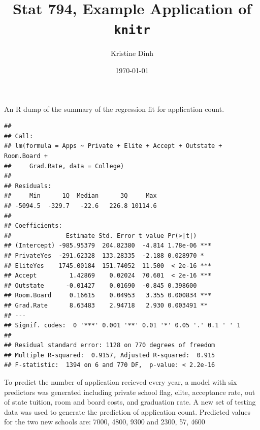 \documentclass{article}\usepackage[]{graphicx}\usepackage[]{color}
\title{Stat 794, Example Application of \texttt{knitr}}
\author{Kristine Dinh}
\date{\today}
\makeatletter
\newenvironment{kframe}{%
 \def\at@end@of@kframe{}%
 \ifinner\ifhmode%
  \def\at@end@of@kframe{\end{minipage}}%
  \begin{minipage}{\columnwidth}%
 \fi\fi%
 \def\FrameCommand##1{\hskip\@totalleftmargin \hskip-\fboxsep
 \colorbox{shadecolor}{##1}\hskip-\fboxsep
     \hskip-\linewidth \hskip-\@totalleftmargin \hskip\columnwidth}%
 \MakeFramed {\advance\hsize-\width
   \@totalleftmargin\z@ \linewidth\hsize
   \@setminipage}}%
 {\par\unskip\endMakeFramed%
 \at@end@of@kframe}
\newenvironment{knitrout}{}{} %
\makeatother
\begin{document}
 
\maketitle





  





An R dump of the summary of the regression fit for application count.
\begin{knitrout}
\color{fgcolor}\begin{kframe}
\begin{verbatim}
## 
## Call:
## lm(formula = Apps ~ Private + Elite + Accept + Outstate + Room.Board + 
##     Grad.Rate, data = College)
## 
## Residuals:
##     Min      1Q  Median      3Q     Max 
## -5094.5  -329.7   -22.6   226.8 10114.6 
## 
## Coefficients:
##               Estimate Std. Error t value Pr(>|t|)    
## (Intercept) -985.95379  204.82380  -4.814 1.78e-06 ***
## PrivateYes  -291.62328  133.28335  -2.188 0.028970 *  
## EliteYes    1745.00184  151.74052  11.500  < 2e-16 ***
## Accept         1.42869    0.02024  70.601  < 2e-16 ***
## Outstate      -0.01427    0.01690  -0.845 0.398600    
## Room.Board     0.16615    0.04953   3.355 0.000834 ***
## Grad.Rate      8.63483    2.94718   2.930 0.003491 ** 
## ---
## Signif. codes:  0 '***' 0.001 '**' 0.01 '*' 0.05 '.' 0.1 ' ' 1
## 
## Residual standard error: 1128 on 770 degrees of freedom
## Multiple R-squared:  0.9157,	Adjusted R-squared:  0.915 
## F-statistic:  1394 on 6 and 770 DF,  p-value: < 2.2e-16
\end{verbatim}
\end{kframe}
\end{knitrout}

To predict the number of application recieved every year, a model with six predictors was generated including private school flag, elite, acceptance rate, out of state tuition, room and board costs, and graduation rate. A new set of testing data was used to generate the prediction of application count. Predicted values for the two new schools are: 7000, 4800, 9300 and 2300, 57, 4600 
\end{document}
